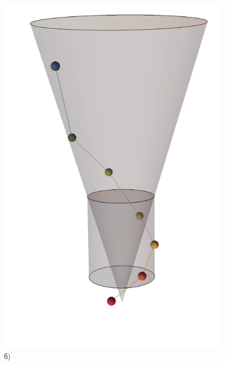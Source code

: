 \documentclass[
11pt,
master, %
subf, %
href, %
colorlinks=true, %
]{disser}
\begin{document}
\begin{figure}[h!]
\begin{minipage}[h]{0.4\linewidth}
		\includegraphics[width=1\linewidth]{vis2} \\ б)
	\end{minipage}
	\vfill
	\begin{minipage}[h]{0.48\linewidth}
		\centering

\end{minipage}
\end{figure}
\end{document}

